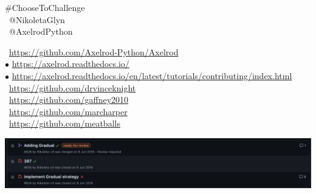 \documentclass{beamer}
\begin{document}
\begin{frame}
    \begin{center}
        \small
    \#ChooseToChallenge \\
    \faTwitter \ @NikoletaGlyn \\
    \faTwitter \ @AxelrodPython \\
    
    \vspace{1cm}
    \end{center}

    \footnotesize
    \faGithub \ \url{https://github.com/Axelrod-Python/Axelrod} \\
    $\bullet$ \url{https://axelrod.readthedocs.io/} \\
    $\bullet$ \url{https://axelrod.readthedocs.io/en/latest/tutorials/contributing/index.html} \\

    \faGithub  \ \url{https://github.com/drvinceknight} \\
    \faGithub  \ \url{https://github.com/gaffney2010} \\
    \faGithub  \ \url{https://github.com/marcharper} \\
    \faGithub  \ \url{https://github.com/meatballs} \\
\end{frame}

\begin{frame}
    \centering
    \includegraphics[width=\textwidth]{static/my_first_pr.png}
\end{frame}
\end{document}
